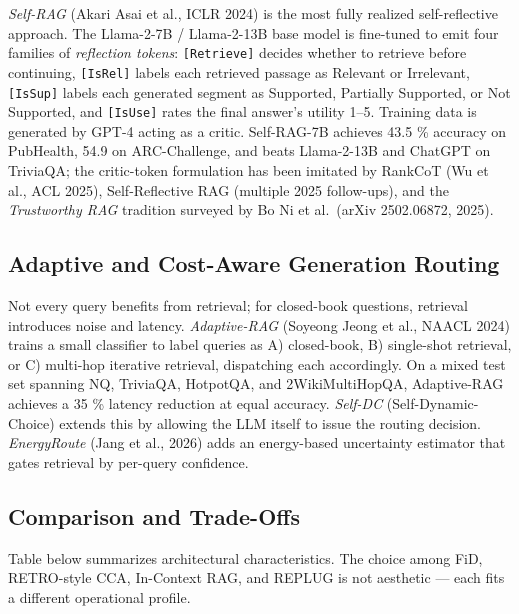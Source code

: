 \documentclass{article}
\begin{document}
\emph{Self-RAG} (Akari Asai et al., ICLR 2024) is the most fully realized self-reflective approach. The Llama-2-7B / Llama-2-13B base model is fine-tuned to emit four families of \emph{reflection tokens}: \texttt{{[}Retrieve{]}} decides whether to retrieve before continuing, \texttt{{[}IsRel{]}} labels each retrieved passage as Relevant or Irrelevant, \texttt{{[}IsSup{]}} labels each generated segment as Supported, Partially Supported, or Not Supported, and \texttt{{[}IsUse{]}} rates the final answer's utility 1--5. Training data is generated by GPT-4 acting as a critic. Self-RAG-7B achieves 43.5 \% accuracy on PubHealth, 54.9 on ARC-Challenge, and beats Llama-2-13B and ChatGPT on TriviaQA; the critic-token formulation has been imitated by RankCoT (Wu et al., ACL 2025), Self-Reflective RAG (multiple 2025 follow-ups), and the \emph{Trustworthy RAG} tradition surveyed by Bo Ni et al.~(arXiv 2502.06872, 2025).

\subsection{Adaptive and Cost-Aware Generation Routing}\label{adaptive-and-cost-aware-generation-routing}

Not every query benefits from retrieval; for closed-book questions, retrieval introduces noise and latency. \emph{Adaptive-RAG} (Soyeong Jeong et al., NAACL 2024) trains a small classifier to label queries as A) closed-book, B) single-shot retrieval, or C) multi-hop iterative retrieval, dispatching each accordingly. On a mixed test set spanning NQ, TriviaQA, HotpotQA, and 2WikiMultiHopQA, Adaptive-RAG achieves a 35 \% latency reduction at equal accuracy. \emph{Self-DC} (Self-Dynamic-Choice) extends this by allowing the LLM itself to issue the routing decision. \emph{EnergyRoute} (Jang et al., 2026) adds an energy-based uncertainty estimator that gates retrieval by per-query confidence.

\subsection{Comparison and Trade-Offs}\label{comparison-and-trade-offs}

Table below summarizes architectural characteristics. The choice among FiD, RETRO-style CCA, In-Context RAG, and REPLUG is not aesthetic --- each fits a different operational profile.
\end{document}
